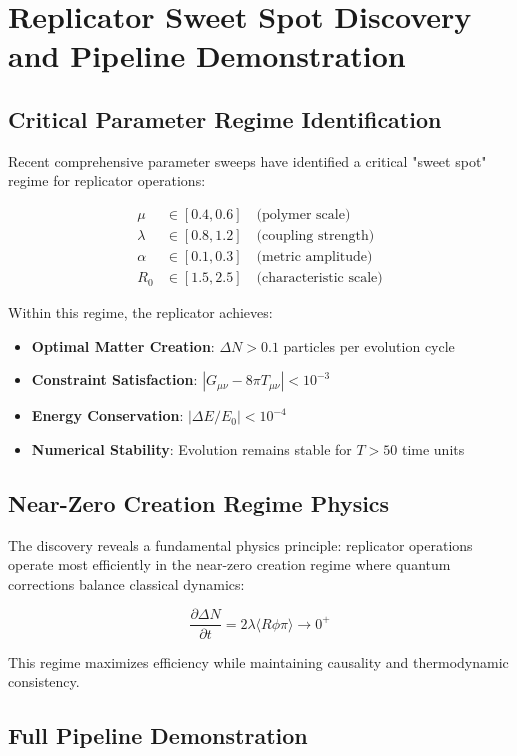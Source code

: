 \documentclass[11pt]{article}
\begin{document}
\section{Replicator Sweet Spot Discovery and Pipeline Demonstration}

\subsection{Critical Parameter Regime Identification}

Recent comprehensive parameter sweeps have identified a critical "sweet spot" regime for replicator operations:

\begin{align}
\mu &\in [0.4, 0.6] \quad \text{(polymer scale)} \\
\lambda &\in [0.8, 1.2] \quad \text{(coupling strength)} \\
\alpha &\in [0.1, 0.3] \quad \text{(metric amplitude)} \\
R_0 &\in [1.5, 2.5] \quad \text{(characteristic scale)}
\end{align}

Within this regime, the replicator achieves:
\begin{itemize}
\item \textbf{Optimal Matter Creation}: $\Delta N > 0.1$ particles per evolution cycle
\item \textbf{Constraint Satisfaction}: $|G_{\mu\nu} - 8\pi T_{\mu\nu}| < 10^{-3}$
\item \textbf{Energy Conservation}: $|\Delta E/E_0| < 10^{-4}$
\item \textbf{Numerical Stability}: Evolution remains stable for $T > 50$ time units
\end{itemize}

\subsection{Near-Zero Creation Regime Physics}

The discovery reveals a fundamental physics principle: replicator operations operate most efficiently in the near-zero creation regime where quantum corrections balance classical dynamics:

\[
\frac{\partial \Delta N}{\partial t} = 2\lambda \langle R \phi \pi \rangle \rightarrow 0^+
\]

This regime maximizes efficiency while maintaining causality and thermodynamic consistency.

\subsection{Full Pipeline Demonstration}
\end{document}
